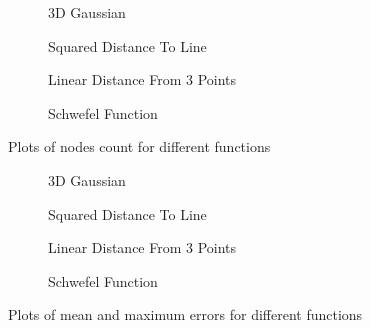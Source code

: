 \begin{figure}
    \centering
    \begin{subfigure}[b]{0.5\textwidth}
        \resizebox{1.0\textwidth}{!}{}
        \caption{3D Gaussian}
        \label{fig:nodes_count_0}
    \end{subfigure}\hfill
    \begin{subfigure}[b]{0.5\textwidth}
        \resizebox{1.0\textwidth}{!}{}
        \caption{Squared Distance To Line}
        \label{fig:nodes_count_1}
    \end{subfigure}
    \begin{subfigure}[b]{0.5\textwidth}
        \resizebox{1.0\textwidth}{!}{}
        \caption{Linear Distance From 3 Points}
        \label{fig:nodes_count_2}
    \end{subfigure}\hfill
    \begin{subfigure}[b]{0.5\textwidth}
        \resizebox{1.0\textwidth}{!}{}
        \caption{Schwefel Function}
        \label{fig:nodes_count_3}
    \end{subfigure}
    \caption{Plots of nodes count for different functions}
    \label{fig:nodes_count}
\end{figure}

\begin{figure}
    \centering
    \begin{subfigure}[b]{0.5\textwidth}
        \resizebox{1.0\textwidth}{!}{}
        \caption{3D Gaussian}
        \label{fig:error_0}
    \end{subfigure}\hfill
    \begin{subfigure}[b]{0.5\textwidth}
        \resizebox{1.0\textwidth}{!}{}
        \caption{Squared Distance To Line}
        \label{fig:error_1}
    \end{subfigure}
    \begin{subfigure}[b]{0.5\textwidth}
        \resizebox{1.0\textwidth}{!}{}
        \caption{Linear Distance From 3 Points}
        \label{fig:error_2}
    \end{subfigure}\hfill
    \begin{subfigure}[b]{0.5\textwidth}
        \resizebox{1.0\textwidth}{!}{}
        \caption{Schwefel Function}
        \label{fig:error_3}
    \end{subfigure}
    \caption{Plots of mean and maximum errors for different functions}
    \label{fig:error}
\end{figure}

